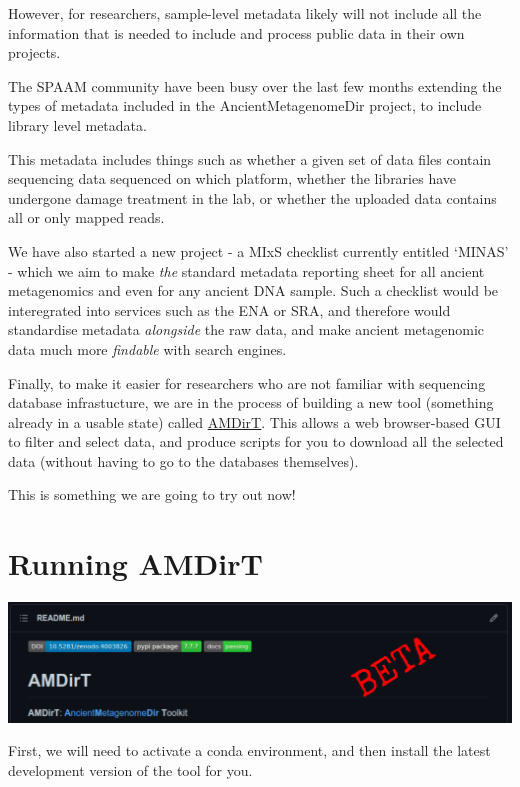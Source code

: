 \documentclass[
  letterpaper,
]{book}
\begin{document}
However, for researchers, sample-level metadata likely will not include
all the information that is needed to include and process public data in
their own projects.

The SPAAM community have been busy over the last few months extending
the types of metadata included in the AncientMetagenomeDir project, to
include library level metadata.

This metadata includes things such as whether a given set of data files
contain sequencing data sequenced on which platform, whether the
libraries have undergone damage treatment in the lab, or whether the
uploaded data contains all or only mapped reads.

We have also started a new project - a MIxS checklist currently entitled
`MINAS' - which we aim to make \emph{the} standard metadata reporting
sheet for all ancient metagenomics and even for any ancient DNA sample.
Such a checklist would be interegrated into services such as the ENA or
SRA, and therefore would standardise metadata \emph{alongside} the raw
data, and make ancient metagenomic data much more \emph{findable} with
search engines.

Finally, to make it easier for researchers who are not familiar with
sequencing database infrastucture, we are in the process of building a
new tool (something already in a usable state) called
\href{https://github.com/SPAAM-community/AMDirT}{AMDirT}. This allows a
web browser-based GUI to filter and select data, and produce scripts for
you to download all the selected data (without having to go to the
databases themselves).

This is something we are going to try out now!

\hypertarget{running-amdirt}{%
\section{Running AMDirT}\label{running-amdirt}}

\includegraphics{assets/images/chapters/introduction-to-ancientmetagenomedir/amdirt-title.png}

First, we will need to activate a conda environment, and then install
the latest development version of the tool for you.
\end{document}
